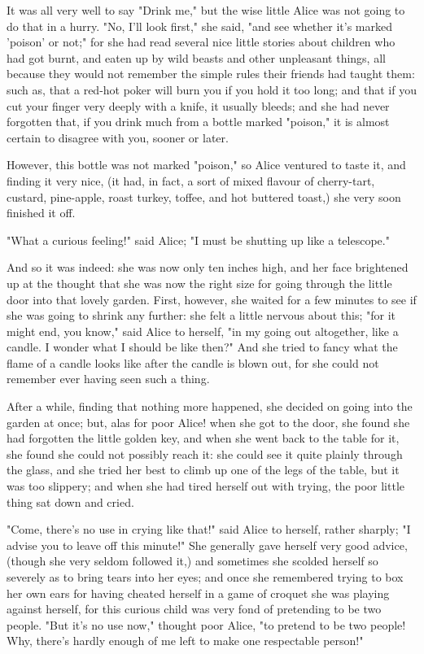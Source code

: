 It was all very well to say "Drink me," but the wise little Alice was not going to do that ​in a hurry. "No, I'll look first," she said, "and see whether it's marked 'poison' or not;" for she had read several nice little stories about children who had got burnt, and eaten up by wild beasts and other unpleasant things, all because they would not remember the simple rules their friends had taught them: such as, that a red-hot poker will burn you if you hold it too long; and that if you cut your finger very deeply with a knife, it usually bleeds; and she had never forgotten that, if you drink much from a bottle marked "poison," it is almost certain to disagree with you, sooner or later.

However, this bottle was not marked "poison," ​so Alice ventured to taste it, and finding it very nice, (it had, in fact, a sort of mixed flavour of cherry-tart, custard, pine-apple, roast turkey, toffee, and hot buttered toast,) she very soon finished it off.

"What a curious feeling!" said Alice; "I must be shutting up like a telescope."

And so it was indeed: she was now only ten inches high, and her face brightened up at the thought that she was now the right size for going through the little door into that lovely garden. First, however, she waited for a few minutes to see if she was going to shrink any further: she felt a little nervous about this; "for it might end, you know," said Alice to herself, "in my going out altogether, like a candle. I wonder what I should be like then?" And she tried to fancy what the flame of a candle looks like after the candle is blown out, ​for she could not remember ever having seen such a thing.

After a while, finding that nothing more happened, she decided on going into the garden at once; but, alas for poor Alice! when she got to the door, she found she had forgotten the little golden key, and when she went back to the table for it, she found she could not possibly reach it: she could see it quite plainly through the glass, and she tried her best to climb up one of the legs of the table, but it was too slippery; and when she had tired herself out with trying, the poor little thing sat down and cried.

"Come, there's no use in crying like that!" said Alice to herself, rather sharply; "I advise you to leave off this minute!" She generally gave herself very good advice, (though she very seldom followed it,) and sometimes she scolded herself so severely as to bring tears into her eyes; and once she remembered trying to box her own ears for having cheated herself ​in a game of croquet she was playing against herself, for this curious child was very fond of pretending to be two people. "But it's no use now," thought poor Alice, "to pretend to be two people! Why, there's hardly enough of me left to make one respectable person!"

